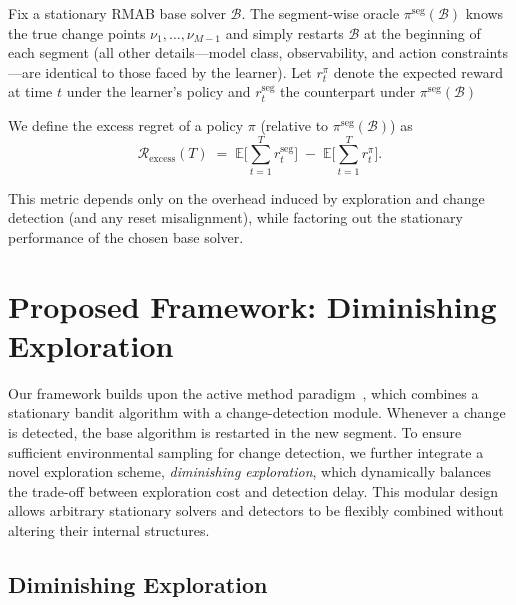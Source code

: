 \documentclass[twoside]{article}
\theoremstyle{plain}
\theoremstyle{definition}
\theoremstyle{remark}
\def\Rex{\mathcal{R}_{\mathrm{excess}}}
\begin{document}
Fix a stationary RMAB base solver $\mathcal{B}$. The segment-wise oracle $\pi^{\mathrm{seg}}(\mathcal{B})$ knows the true change points $\nu_1,\ldots,\nu_{M-1}$ and simply restarts $\mathcal{B}$ at the beginning of each segment (all other details—model class, observability, and action constraints—are identical to those faced by the learner). Let $r_t^{\pi}$ denote the expected reward at time $t$ under the learner’s policy and $r_t^{\mathrm{seg}}$ the counterpart under $\pi^{\mathrm{seg}}(\mathcal{B})$



We define the excess regret of a policy $\pi$ (relative to $\pi^{\mathrm{seg}}(\mathcal{B})$) as
\begin{equation}
    \Rex(T)
    \;=\;
    \mathbb{E}\!\Big[\sum_{t=1}^{T} r_t^{\mathrm{seg}}\Big]
    \;-\;
    \mathbb{E}\!\Big[\sum_{t=1}^{T} r_t^{\pi}\Big].
\end{equation}

This metric depends only on the overhead induced by exploration and change detection (and any reset misalignment), while factoring out the stationary performance of the chosen base solver.

\section{Proposed Framework: Diminishing Exploration}

Our framework builds upon the active method paradigm~\citep{yu2009piecewise,liu2018change,
cao2019nearly}, which combines a 
stationary bandit algorithm with a change-detection module. 
Whenever a change is detected, the base algorithm is restarted in the new segment. 
To ensure sufficient environmental sampling for change detection, 
we further integrate a novel exploration scheme, \emph{diminishing exploration}, 
which dynamically balances the trade-off between exploration cost 
and detection delay. This modular design allows arbitrary stationary solvers and detectors to be flexibly combined without altering their internal structures.


\subsection{Diminishing Exploration}
\end{document}
